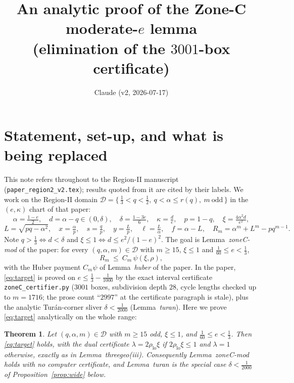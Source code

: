 \documentclass[11pt]{amsart}
\title[Analytic Zone C, moderate $e$]{An analytic proof of the Zone-C
moderate-$e$ lemma\\ (elimination of the $3001$-box certificate)}
\author{Claude (v2, 2026-07-17)}
\newtheorem{theorem}{Theorem}[section]
\newcommand{\D}{\mathcal D}
\begin{document}
\maketitle

\section{Statement, set-up, and what is being replaced}\label{sec:setup}

This note refers throughout to the Region-II manuscript
(\texttt{paper\_region2\_v2.tex}); results quoted from it are cited by their
labels.  We work on the Region-II domain
$\D=\{\,\tfrac13<q<\tfrac12,\ q<\alpha\le r(q),\ m\ \text{odd}\,\}$ in the
$(e,\kappa)$ chart of that paper:
\[
 \alpha=\tfrac{1-e}2,\quad d=\alpha-q\in(0,\delta),\quad
 \delta=\tfrac{1-3e}6,\quad \kappa=\tfrac de,\quad p=1-q,\quad
 \xi=\tfrac{4\alpha^2d}{e^2},
\]
\[
 L=\sqrt{pq-\alpha^2},\quad x=\tfrac\alpha p,\quad s=\tfrac qp,\quad
 y=\tfrac Lp,\quad \ell=\tfrac L\alpha,\quad f=\alpha-L,\quad
 R_m=\alpha^m+L^m-pq^{m-1}.
\]
Note $q>\tfrac13\iff d<\delta$ and $\xi\le1\iff d\le e^2/(1-e)^2$.  The goal
is Lemma~\emph{zoneC-mod} of the paper: for every
$(q,\alpha,m)\in\D$ with $m\ge15$, $\xi\le1$ and $\tfrac1{60}\le e<\tfrac13$,
\begin{equation}\label{eq:target}
 R_m\ \le\ C_m\,\psi(\xi,\rho),
\end{equation}
with the Huber payment $C_m\psi$ of Lemma~\emph{huber} of the paper.  In the
paper, \eqref{eq:target} is proved on $e\le\tfrac13-\tfrac1{1000}$ by the
exact interval certificate \texttt{zoneC\_certifier.py} ($3001$ boxes,
subdivision depth $28$, cycle lengths checked up to $m=1716$; the prose count
``$2997$'' at the certificate paragraph is stale), plus the analytic
Tur\'an-corner sliver $\delta<\tfrac1{2000}$ (Lemma~\emph{turan}).  Here we
prove \eqref{eq:target} analytically on the whole range:

\begin{theorem}\label{thm:main}
Let $(q,\alpha,m)\in\D$ with $m\ge15$ odd, $\xi\le1$, and
$\tfrac1{60}\le e<\tfrac13$.  Then \eqref{eq:target} holds, with the dual
certificate $\lambda=2\rho_{\mathrm{lo}}\xi$ if
$2\rho_{\mathrm{lo}}\xi\le1$ and $\lambda=1$ otherwise, exactly as in
Lemma~\emph{threegeo}(iii).  Consequently Lemma~\emph{zoneC-mod} holds with
no computer certificate, and Lemma~\emph{turan} is the special case
$\delta<\tfrac1{2000}$ of Proposition~\ref{prop:wide} below.
\end{theorem}
\end{document}
